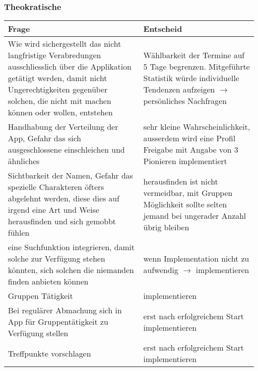 \subsubsection{Theokratische}

\begin{tabularx}{\textwidth}{X|X}
Frage & Entscheid \\\hline
Wie wird sichergestellt das nicht langfristige Verabredungen ausschliesslich über die Applikation getätigt werden, damit nicht Ungerechtigkeiten gegenüber solchen, die nicht mit machen können oder wollen, entstehen & Wählbarkeit der Termine auf 5 Tage begrenzen. Mitgeführte Statistik würde individuelle Tendenzen aufzeigen $\rightarrow$ persönliches Nachfragen \\\hline
Handhabung der Verteilung der App, Gefahr das sich ausgeschlossene einschleichen und ähnliches & sehr kleine Wahrscheinlichkeit, ausserdem wird eine Profil Freigabe mit Angabe von 3 Pionieren implementiert\\\hline
Sichtbarkeit der Namen, Gefahr das spezielle Charakteren öfters abgelehnt werden, diese dies auf irgend eine Art und Weise herausfinden und sich gemobbt fühlen & herausfinden ist nicht vermeidbar, mit Gruppen Möglichkeit sollte selten jemand bei ungerader Anzahl übrig bleiben\\\hline
eine Suchfunktion integrieren, damit solche zur Verfügung stehen könnten, sich solchen die niemanden finden anbieten können & wenn Implementation nicht zu aufwendig $\rightarrow$ implementieren\\\hline
Gruppen Tätigkeit & implementieren \\\hline
Bei regulärer Abmachung sich in App für Gruppentätigkeit zu Verfügung stellen & erst nach erfolgreichem Start implementieren\\\hline
Treffpunkte vorschlagen & erst nach erfolgreichem Start implementieren\\
\end{tabularx}

